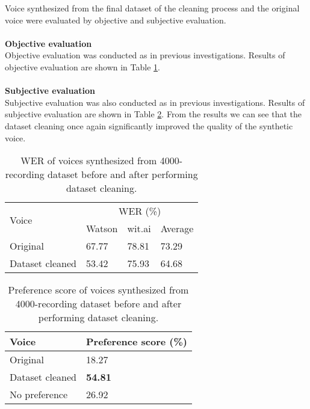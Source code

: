 \documentclass[12pt]{article}
\begin{document}
Voice synthesized from the final dataset of the cleaning process and the original voice were evaluated by objective and subjective evaluation.\\\\
\textbf{Objective evaluation}
\vspace{0.28cm}\\
Objective evaluation was conducted as in previous investigations. Results of objective evaluation are shown in Table \ref{tab_werCombination4000}.\\\\
\textbf{Subjective evaluation}
\vspace{0.28cm}\\
Subjective evaluation was also conducted as in previous investigations. Results of subjective evaluation are shown in Table \ref{tab_subEvaCombination4000}. From the results we can see that the dataset cleaning once again significantly improved the quality of the synthetic voice.
\begin{table}[]
\begin{center}
\caption{WER of voices synthesized from 4000-recording dataset before and after performing dataset cleaning.}
\vspace{-0.1cm}
\label{tab_werCombination4000}
\vspace{3mm}
\begin{tabular}{|l|l|l|l|}
\hline
\multirow{2}{2.5cm}{Voice} &
\multicolumn{3}{c|}{WER (\%)} \\ \cline{2-4}
& Watson & wit.ai & Average \\
\hline
Original            & 67.77 & 78.81 & 73.29 \\
Dataset cleaned & 53.42 & 75.93 & 64.68 \\
\hline
\end{tabular}
\end{center}
\end{table}

\begin{table}[]
\begin{center}
\caption{Preference score of voices synthesized from 4000-recording dataset before and after performing dataset cleaning.}
\label{tab_subEvaCombination4000}
\vspace{3mm}
\begin{tabular}{|l|l|}
\hline
Voice & Preference score (\%) \\
\hline
Original                & 18.27 \\
Dataset cleaned  & \textbf{54.81} \\
No preference           & 26.92 \\
\hline
\end{tabular}
\end{center}
\end{table}
\end{document}

